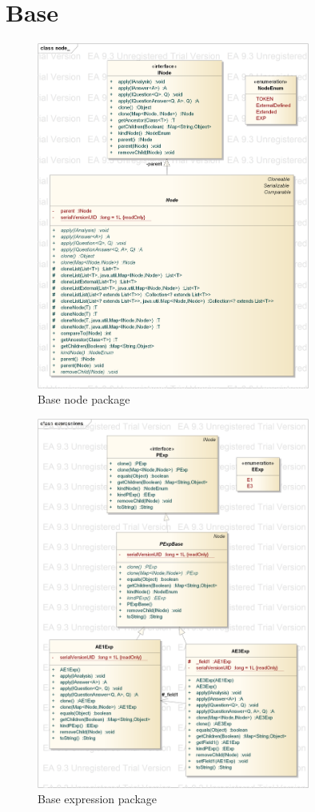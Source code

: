 \documentclass{overturerepchap}
\begin{document}
\section{Base}
\begin{figure}[htb]
\centering
\includegraphics[width=0.8\textwidth]{figures/base_node}
\caption{Base node package}
\end{figure}

\begin{figure}[htb]
\centering
\includegraphics[width=0.8\textwidth]{figures/base_expressions}
\caption{Base expression package}
\end{figure}
\end{document}

